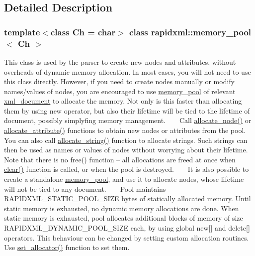\subsection{Detailed Description}
\subsubsection*{template$<$class Ch = char$>$\newline
class rapidxml\+::memory\+\_\+pool$<$ Ch $>$}

This class is used by the parser to create new nodes and attributes, without overheads of dynamic memory allocation. In most cases, you will not need to use this class directly. However, if you need to create nodes manually or modify names/values of nodes, you are encouraged to use \mbox{\hyperlink{classrapidxml_1_1memory__pool}{memory\+\_\+pool}} of relevant \mbox{\hyperlink{classrapidxml_1_1xml__document}{xml\+\_\+document}} to allocate the memory. Not only is this faster than allocating them by using {\ttfamily new} operator, but also their lifetime will be tied to the lifetime of document, possibly simplyfing memory management. ~\newline
~\newline
 Call \mbox{\hyperlink{classrapidxml_1_1memory__pool_a4118581c29ee9a2f6b55ebf7dac185f8}{allocate\+\_\+node()}} or \mbox{\hyperlink{classrapidxml_1_1memory__pool_a3de2a66c983336e006ea3844e244ed30}{allocate\+\_\+attribute()}} functions to obtain new nodes or attributes from the pool. You can also call \mbox{\hyperlink{classrapidxml_1_1memory__pool_a171941b39d55b868358da97462185f58}{allocate\+\_\+string()}} function to allocate strings. Such strings can then be used as names or values of nodes without worrying about their lifetime. Note that there is no {\ttfamily free()} function -- all allocations are freed at once when \mbox{\hyperlink{classrapidxml_1_1memory__pool_aad377c835fdaed1cb2cc9df194cf84e4}{clear()}} function is called, or when the pool is destroyed. ~\newline
~\newline
 It is also possible to create a standalone \mbox{\hyperlink{classrapidxml_1_1memory__pool}{memory\+\_\+pool}}, and use it to allocate nodes, whose lifetime will not be tied to any document. ~\newline
~\newline
 Pool maintains {\ttfamily R\+A\+P\+I\+D\+X\+M\+L\+\_\+\+S\+T\+A\+T\+I\+C\+\_\+\+P\+O\+O\+L\+\_\+\+S\+I\+ZE} bytes of statically allocated memory. Until static memory is exhausted, no dynamic memory allocations are done. When static memory is exhausted, pool allocates additional blocks of memory of size {\ttfamily R\+A\+P\+I\+D\+X\+M\+L\+\_\+\+D\+Y\+N\+A\+M\+I\+C\+\_\+\+P\+O\+O\+L\+\_\+\+S\+I\+ZE} each, by using global {\ttfamily new\mbox{[}\mbox{]}} and {\ttfamily delete\mbox{[}\mbox{]}} operators. This behaviour can be changed by setting custom allocation routines. Use \mbox{\hyperlink{classrapidxml_1_1memory__pool_a84d3d8d2cdfc00501e1dcf26d889ae03}{set\+\_\+allocator()}} function to set them. ~\newline
